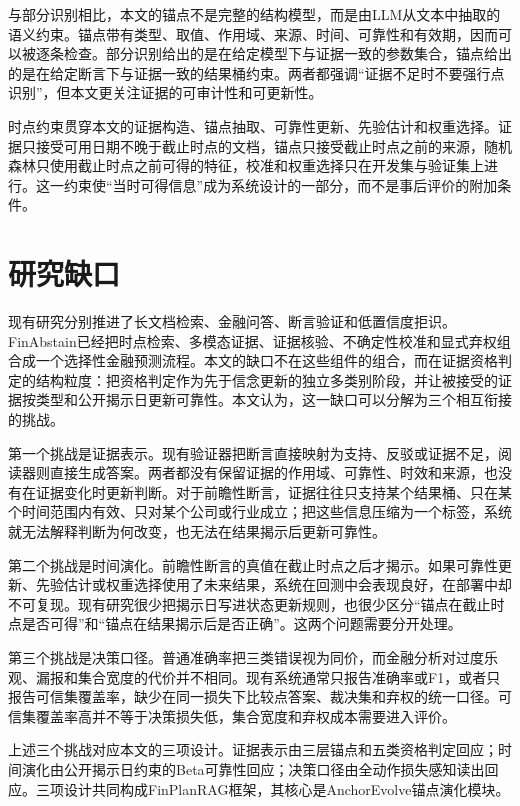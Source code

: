 与部分识别相比，本文的锚点不是完整的结构模型，而是由LLM从文本中抽取的语义约束。锚点带有类型、取值、作用域、来源、时间、可靠性和有效期，因而可以被逐条检查。部分识别给出的是在给定模型下与证据一致的参数集合，锚点给出的是在给定断言下与证据一致的结果桶约束。两者都强调“证据不足时不要强行点识别”，但本文更关注证据的可审计性和可更新性。

时点约束贯穿本文的证据构造、锚点抽取、可靠性更新、先验估计和权重选择。证据只接受可用日期不晚于截止时点的文档，锚点只接受截止时点之前的来源，随机森林只使用截止时点之前可得的特征，校准和权重选择只在开发集与验证集上进行。这一约束使“当时可得信息”成为系统设计的一部分，而不是事后评价的附加条件。

\section{研究缺口}

现有研究分别推进了长文档检索、金融问答、断言验证和低置信度拒识。FinAbstain已经把时点检索、多模态证据、证据核验、不确定性校准和显式弃权组合成一个选择性金融预测流程\citep{torres2026finabstain}。本文的缺口不在这些组件的组合，而在证据资格判定的结构粒度：把资格判定作为先于信念更新的独立多类别阶段，并让被接受的证据按类型和公开揭示日更新可靠性。本文认为，这一缺口可以分解为三个相互衔接的挑战。

第一个挑战是证据表示。现有验证器把断言直接映射为支持、反驳或证据不足，阅读器则直接生成答案。两者都没有保留证据的作用域、可靠性、时效和来源，也没有在证据变化时更新判断。对于前瞻性断言，证据往往只支持某个结果桶、只在某个时间范围内有效、只对某个公司或行业成立；把这些信息压缩为一个标签，系统就无法解释判断为何改变，也无法在结果揭示后更新可靠性。

第二个挑战是时间演化。前瞻性断言的真值在截止时点之后才揭示。如果可靠性更新、先验估计或权重选择使用了未来结果，系统在回测中会表现良好，在部署中却不可复现。现有研究很少把揭示日写进状态更新规则，也很少区分“锚点在截止时点是否可得”和“锚点在结果揭示后是否正确”。这两个问题需要分开处理。

第三个挑战是决策口径。普通准确率把三类错误视为同价，而金融分析对过度乐观、漏报和集合宽度的代价并不相同。现有系统通常只报告准确率或F1，或者只报告可信集覆盖率，缺少在同一损失下比较点答案、裁决集和弃权的统一口径。可信集覆盖率高并不等于决策损失低，集合宽度和弃权成本需要进入评价。

上述三个挑战对应本文的三项设计。证据表示由三层锚点和五类资格判定回应；时间演化由公开揭示日约束的Beta可靠性回应；决策口径由全动作损失感知读出回应。三项设计共同构成FinPlanRAG框架，其核心是AnchorEvolve锚点演化模块。

